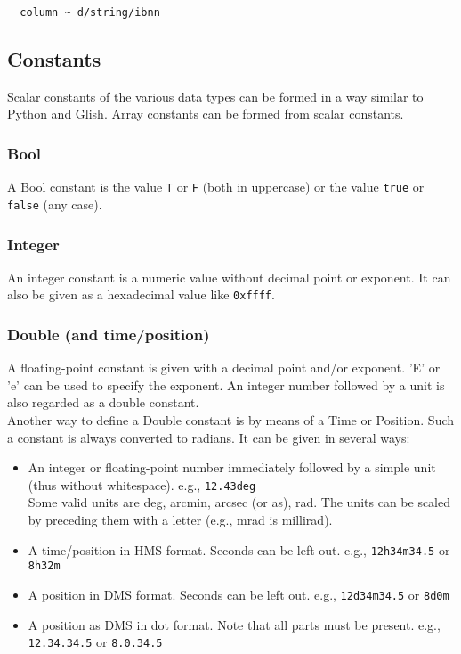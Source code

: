 \begin{verbatim}
  column ~ d/string/ibnn
\end{verbatim}

\subsection{\label{TAQL:CONSTANTS}Constants}
Scalar constants of the various data types can be formed in a way similar
to Python and Glish. Array constants can be formed from scalar
constants.
\subsubsection{Bool}
  A Bool constant is the value \texttt{T} or \texttt{F} (both in
  uppercase) or the value \texttt{true} or \texttt{false} (any case).
\subsubsection{Integer}
  An integer constant is a numeric value without decimal point or exponent.
  It can also be given as a hexadecimal value like \texttt{0xffff}.
\subsubsection{Double (and time/position)}
  A floating-point constant is given with a decimal point and/or
  exponent. 'E' or 'e' can be used to specify the exponent. An integer
  number followed by a unit is also regarded as a double constant.
  \\Another way to define a Double constant is by means of
  a Time or Position. Such a constant is always converted to radians.
  It can be given in several ways:
  \begin{itemize}
  \item An integer or floating-point number immediately
    followed by a simple unit
    (thus without whitespace). e.g., \texttt{12.43deg}
    \\Some valid units are deg, arcmin, arcsec (or as), rad.
    The units can be scaled by preceding them with a letter
    (e.g., mrad is millirad).
  \item A time/position in HMS format. Seconds can be left out.
    e.g., \texttt{12h34m34.5} or \texttt{8h32m}
  \item A position in DMS format. Seconds can be left out.
    e.g., \texttt{12d34m34.5} or \texttt{8d0m}
  \item A position as DMS in dot format. Note that all parts
    must be present.
    e.g., \texttt{12.34.34.5} or \texttt{8.0.34.5}
  \end{itemize}
